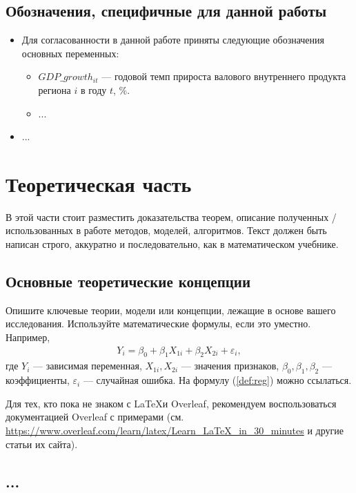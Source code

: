 \documentclass[a4paper,12pt]{article}
\begin{document}
\subsection*{Обозначения, специфичные для данной работы}

\begin{itemize}
    \item Для согласованности в данной работе приняты следующие обозначения основных переменных:
          \begin{itemize}
              \item $GDP\_growth_{it}$ --- годовой темп прироста валового внутреннего продукта региона $i$ в году $t$, \%.
              \item ...
          \end{itemize}
    \item ...
\end{itemize}


\newpage

\section{Теоретическая часть}
\label{sec:theory}

В этой части стоит разместить доказательства теорем, описание полученных / использованных в работе методов, моделей, алгоритмов. Текст должен быть написан строго, аккуратно и последовательно, как в математическом учебнике.

\subsection{Основные теоретические концепции}
Опишите ключевые теории, модели или концепции, лежащие в основе вашего исследования. Используйте математические формулы, если это уместно. Например,
\begin{eqnarray}\label{def:reg}
    Y_i = \beta_0 + \beta_1 X_{1i} + \beta_2 X_{2i} + \varepsilon_i,
\end{eqnarray}
где $Y_i$ — зависимая переменная, $X_{1i}, X_{2i}$ — значения признаков, $\beta_0, \beta_1, \beta_2$ — коэффициенты, $\varepsilon_i$ — случайная ошибка. На формулу (\ref{def:reg}) можно ссылаться.

Для тех, кто пока не знаком с \LaTeX и Overleaf, рекомендуем воспользоваться документацией Overleaf с примерами (см. \url{https://www.overleaf.com/learn/latex/Learn_LaTeX_in_30_minutes} и другие статьи их сайта).


\subsection{...}
\end{document}
